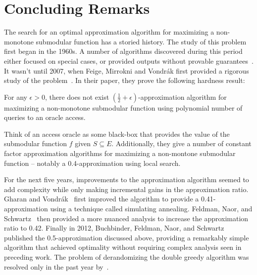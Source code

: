 \documentclass{article}
\begin{document}
\section{Concluding Remarks}\label{sec:conclusion}

The search for an optimal approximation algorithm for maximizing a non-monotone submodular function has a storied history. The study of this problem first began in the 1960s. A number of algorithms discovered during this period either focused on special cases, or provided outputs without provable guarantees~\cite{GST99, Kha68, GG05}. It wasn't until 2007, when Feige, Mirrokni and Vondr\'{a}k first provided a rigorous study of the problem~\cite{FMV07}. In their paper, they prove the following hardness result:
\begin{theorem}
For any $\epsilon > 0$, there does not exist $(\frac{1}{2} + \epsilon)$-approximation algorithm for maximizing a non-monotone submodular function using polynomial number of queries to an oracle access.
\end{theorem}

Think of an access oracle as some black-box that provides the value of the submodular function $f$ given $S \subseteq E$. Additionally, they give a number of constant factor approximation algorithms for maximizing a non-montone submodular function -- notably a 0.4-approximation using local search.

For the next five years, improvements to the approximation algorithm seemed to add complexity while only making incremental gains in the approximation ratio. Gharan and Vondr\'{a}k~\cite{GV11} first improved the algorithm to provide a 0.41-approximation using a technique called simulating annealing. Feldman, Naor, and Schwartz~\cite{FNS11} then provided a more nuanced analysis to increase the approximation ratio to 0.42. Finally in 2012, Buchbinder, Feldman, Naor, and Schwartz~\cite{BFSS15} published the 0.5-approximation discussed above, providing a remarkably simple algorithm that achieved optimality without requiring complex analysis seen in preceding work. The problem of derandomizing the double greedy algorithm was resolved only in the past year by~\cite{BF18}.
\end{document}
